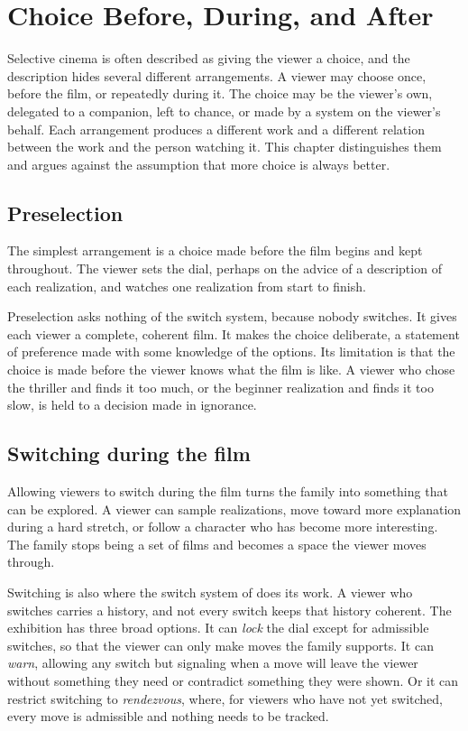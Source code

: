 \chapter{Choice Before, During, and After}\label{ch:choice}

Selective cinema is often described as giving the viewer a choice, and the description hides several different arrangements. A viewer may choose once, before the film, or repeatedly during it. The choice may be the viewer's own, delegated to a companion, left to chance, or made by a system on the viewer's behalf. Each arrangement produces a different work and a different relation between the work and the person watching it. This chapter distinguishes them and argues against the assumption that more choice is always better.

\section{Preselection}

The simplest arrangement is a choice made before the film begins and kept throughout. The viewer sets the dial, perhaps on the advice of a description of each realization, and watches one realization from start to finish.

Preselection asks nothing of the switch system, because nobody switches. It gives each viewer a complete, coherent film. It makes the choice deliberate, a statement of preference made with some knowledge of the options. Its limitation is that the choice is made before the viewer knows what the film is like. A viewer who chose the thriller and finds it too much, or the beginner realization and finds it too slow, is held to a decision made in ignorance.

\section{Switching during the film}

Allowing viewers to switch during the film turns the family into something that can be explored. A viewer can sample realizations, move toward more explanation during a hard stretch, or follow a character who has become more interesting. The family stops being a set of films and becomes a space the viewer moves through.

Switching is also where the switch system of  does its work. A viewer who switches carries a history, and not every switch keeps that history coherent. The exhibition has three broad options. It can \emph{lock} the dial except for admissible switches, so that the viewer can only make moves the family supports. It can \emph{warn}, allowing any switch but signaling when a move will leave the viewer without something they need or contradict something they were shown. Or it can restrict switching to \emph{rendezvous}, where, for viewers who have not yet switched, every move is admissible and nothing needs to be tracked.

